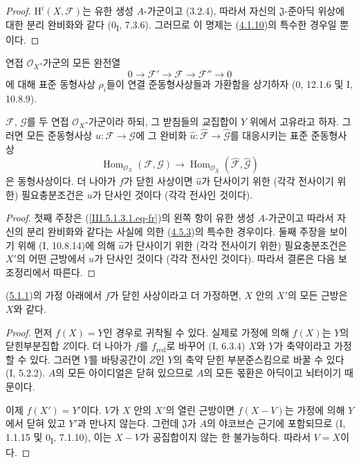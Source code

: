 \begin{proof}
$\mathrm H^i(X,\mathcal F)$는 유한 생성 $A$-가군이고 (3.2.4),
따라서 자신의 $\mathfrak J$-준아딕 위상에 대한 분리 완비화와
같다 (0\textsubscript{I}, 7.3.6). 그러므로 이 명제는
(\hyperref[III.4.1.10-fr]{4.1.10})의 특수한 경우일 뿐이다.
\end{proof}

연접 $\mathcal O_X$-가군의 모든 완전열
\[
0\longrightarrow\mathcal F'\longrightarrow\mathcal F
\longrightarrow\mathcal F''\longrightarrow0
\]
에 대해 표준 동형사상 $\rho_i$들이 연결 준동형사상들과 가환함을
상기하자 (0, 12.1.6 및 I, 10.8.9).

\begin{corollary}[5.1.3]
\label{III.5.1.3-fr}
$\mathcal F$, $\mathcal G$를 두 연접 $\mathcal O_X$-가군이라 하되,
그 받침들의 교집합이 $Y$ 위에서 고유라고 하자. 그러면 모든
준동형사상 $u:\mathcal F\to\mathcal G$에 그 완비화
$\widehat u:\widehat{\mathcal F}\to\widehat{\mathcal G}$를
대응시키는 표준 준동형사상
\begin{equation}
\operatorname{Hom}_{\mathcal O_X}(\mathcal F,\mathcal G)
\longrightarrow
\operatorname{Hom}_{\mathcal O_{\widehat X}}
(\widehat{\mathcal F},\widehat{\mathcal G})
\tag{5.1.3.1}
\label{III.5.1.3.1.eq-fr}
\end{equation}
은 동형사상이다. 더 나아가 $f$가 닫힌 사상이면
$\widehat u$가 단사이기 위한 (각각 전사이기 위한) 필요충분조건은
$u$가 단사인 것이다 (각각 전사인 것이다).
\end{corollary}

\begin{proof}
첫째 주장은 (\ref{III.5.1.3.1.eq-fr})의 왼쪽 항이 유한 생성
$A$-가군이고 따라서 자신의 분리 완비화와 같다는 사실에 의한
(\hyperref[III.4.5.3-fr]{4.5.3})의 특수한 경우이다.
둘째 주장을 보이기 위해 (I, 10.8.14)에 의해
$\widehat u$가 단사이기 위한 (각각 전사이기 위한) 필요충분조건은
$X'$의 어떤 근방에서 $u$가 단사인 것이다 (각각 전사인 것이다).
따라서 결론은 다음 보조정리에서 따른다.
\end{proof}


\begin{lemma}[5.1.3.1]
\label{III.5.1.3.1-fr}
(\hyperref[III.5.1.1-fr]{5.1.1})의 가정 아래에서 $f$가 닫힌
사상이라고 더 가정하면, $X$ 안의 $X'$의 모든 근방은 $X$와 같다.
\end{lemma}

\begin{proof}
먼저 $f(X)=Y$인 경우로 귀착될 수 있다. 실제로 가정에 의해
$f(X)$는 $Y$의 닫힌부분집합 $Z$이다. 더 나아가 $f$를
$f_{\mathrm{red}}$로 바꾸어 (I, 6.3.4) $X$와 $Y$가 축약이라고
가정할 수 있다. 그러면 $Y$를 바탕공간이 $Z$인 $Y$의 축약 닫힌
부분준스킴으로 바꿀 수 있다 (I, 5.2.2). $A$의 모든 아이디얼은
닫혀 있으므로 $A$의 모든 몫환은 아딕이고 뇌터이기 때문이다.

이제 $f(X')=Y'$이다. $V$가 $X$ 안의 $X'$의 열린 근방이면
$f(X-V)$는 가정에 의해 $Y$에서 닫혀 있고 $Y'$과 만나지 않는다.
그런데 $\mathfrak J$가 $A$의 야코브슨 근기에 포함되므로
(I, 1.1.15 및 0\textsubscript{I}, 7.1.10), 이는 $X-V$가
공집합이지 않는 한 불가능하다. 따라서 $V=X$이다.
\end{proof}

